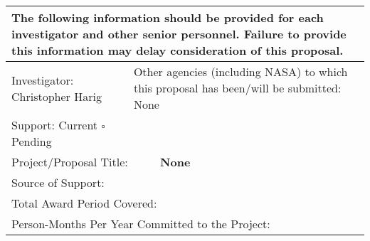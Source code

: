 \documentclass[12pt]{article}
\begin{document}
\renewcommand{\arraystretch}{1.2}
\footnotesize
\begin{tabularx}{0.5\textwidth}{|p{5cm}p{4cm}p{4cm}X|} \hline

\multicolumn{4}{|p{\dimexpr\textwidth-2\tabcolsep-0.8pt}|}{The following information should be provided for each investigator and other senior personnel. Failure to provide this information may delay consideration of this proposal.} \\

\hline

\multicolumn{2}{|l|}{Investigator: Christopher Harig} & \multicolumn{2}{p{\dimexpr\textwidth-6\tabcolsep-1.2pt-9cm}|}{Other agencies (including NASA) to which this proposal has been/will be submitted: None} \\

\hline

Support: \rlap{$\square$}\raisebox{2pt}{\large\hspace{1pt}\ding{51}} Current $\square$ Pending & {} & {} & {} \\ 

\multicolumn{4}{|p{\dimexpr\textwidth-2\tabcolsep-0.8pt}|}{Project/Proposal Title: \ \ \ \ \ \textbf{None}}\\

\multicolumn{4}{|p{\dimexpr\textwidth-2\tabcolsep-0.8pt}|}{Source of Support:}\\

\multicolumn{4}{|p{\dimexpr\textwidth-2\tabcolsep-0.8pt}|}{Total Award Period Covered:}\\

\multicolumn{4}{|p{\dimexpr\textwidth-2\tabcolsep-0.8pt}|}{Person-Months Per Year Committed to the Project:}\\

\hline


\end{tabularx}
\end{document}
